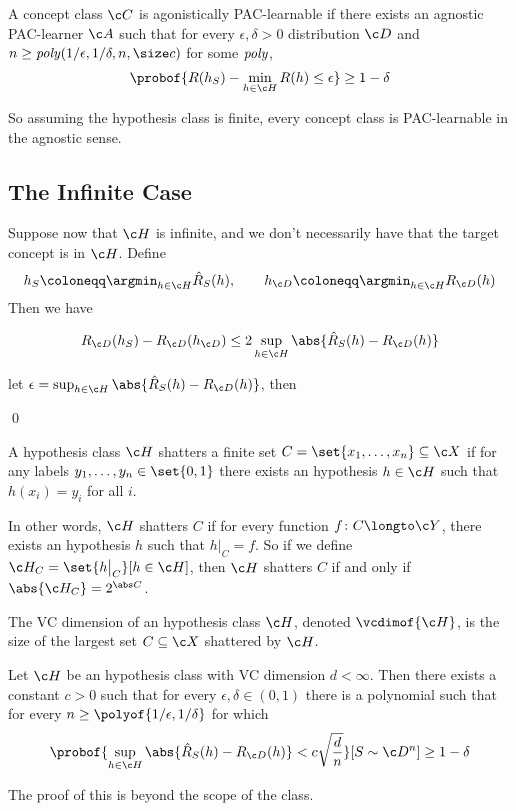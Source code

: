 \bdefn

    A concept class $\c C$ is {\emphcolor agonistically PAC-learnable} if there exists an {\emphcolor agnostic PAC-learner} $\c A$ such that for every $\epsilon,\delta>0$ distribution $\c D$ and 
    $n\geq{\it poly}(1/\epsilon,1/\delta,n,\size c)$ for some ${\it poly}$,
    $$ \probof{R(h_S) - \min_{h\in\c H}R(h)\leq\epsilon} \geq 1 - \delta $$

\edefn

So assuming the hypothesis class is finite, every concept class is PAC-learnable in the agnostic sense.

\subsection{The Infinite Case}

\noindent Suppose now that $\c H$ is infinite, and we don't necessarily have that the target concept is in $\c H$.
Define
$$ h_S \coloneqq \argmin_{h\in\c H}\hat R_S(h),\qquad h_{\c D} \coloneqq \argmin_{h\in\c H}R_{\c D}(h) $$
Then we have

\blemm

    $$ R_{\c D}(h_S) - R_{\c D}(h_{\c D}) \leq 2\sup_{h\in\c H}\abs{\hat R_S(h) - R_{\c D}(h)} $$

\elemm

\Proof let $\epsilon=\sup_{h\in\c H}\abs{\hat R_S(h)-R_{\c D}(h)}$, then

\medskip
\centerline{\vbox{}}
\qed

\bdefn

    A hypothesis class $\c H$ {\emphcolor shatters} a finite set $C=\set{x_1,\dots,x_n}\subseteq\c X$ if for any labels $y_1,\dots,y_n\in\set{0,1}$ there exists an hypothesis $h\in\c H$ such that
    $h(x_i)=y_i$ for all $i$.

\edefn

In other words, $\c H$ shatters $C$ if for every function $f\colon C\longto\c Y$, there exists an hypothesis $h$ such that $h\bigl|_C=f$.
So if we define $\c H_C=\set{h\bigl|_C}[h\in\c H]$, then $\c H$ shatters $C$ if and only if $\abs{\c H_C}=2^{\abs C}$.

\bdefn

    The {\emphcolor VC dimension} of an hypothesis class $\c H$, denoted $\vcdimof{\c H}$, is the size of the largest set $C\subseteq\c X$ shattered by $\c H$.

\edefn

\bthrm

    Let $\c H$ be an hypothesis class with VC dimension $d<\infty$.
    Then there exists a constant $c>0$ such that for every $\epsilon,\delta\in(0,1)$ there is a polynomial such that for every $n\geq\polyof{1/\epsilon,1/\delta}$ for which
    $$ \probof{\sup_{h\in\c H}\abs{\hat R_S(h) - R_{\c D}(h)} < c\sqrt{\frac dn}}[S\sim\c D^n] \geq 1 - \delta $$

\ethrm

The proof of this is beyond the scope of the class.

